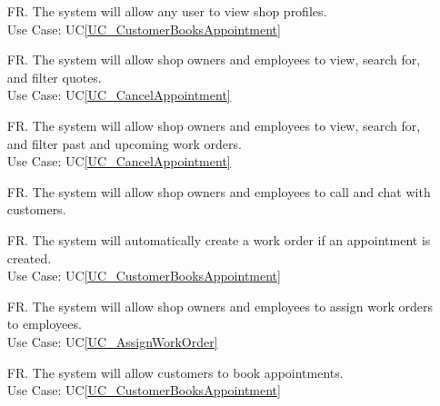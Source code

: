 \documentclass[12pt]{article}
\newcounter{reqnum} %
\begin{document}
\begin{itemize}
\item[FR\refstepcounter{reqnum}\thereqnum \label{R_ViewShop}.] The system will allow any user to view shop profiles.\\
Use Case: UC\ref{UC_CustomerBooksAppointment}


\addtocounter{reqnum}{1}
\item[FR\refstepcounter{reqnum}\thereqnum \label{R_ViewQuotes}.] The system will allow shop owners and employees to view, search for, and filter quotes.\\
Use Case: UC\ref{UC_CancelAppointment}

\item[FR\refstepcounter{reqnum}\thereqnum \label{R_ViewWorkOrder}.] The system will allow shop owners and employees to view, search for, and filter past and upcoming work orders.\\
Use Case: UC\ref{UC_CancelAppointment}

\item[FR\refstepcounter{reqnum}\thereqnum \label{R_CustomerCommunication}.] The system will allow shop owners and employees to call and chat with customers.
\addtocounter{reqnum}{1}

\item[FR\refstepcounter{reqnum}\thereqnum \label{R_AutoCreateWorkOrder}.] The system will automatically create a work order if an appointment is created.\\
Use Case: UC\ref{UC_CustomerBooksAppointment}

\item[FR\refstepcounter{reqnum}\thereqnum \label{R_AssignWorkOrder}.] The system will allow shop owners and employees to assign work orders to employees.\\
Use Case: UC\ref{UC_AssignWorkOrder}

\item[FR\refstepcounter{reqnum}\thereqnum \label{R_BookAppointment}.] The system will allow customers to book appointments.\\
Use Case: UC\ref{UC_CustomerBooksAppointment}


\end{itemize}
\end{document}

